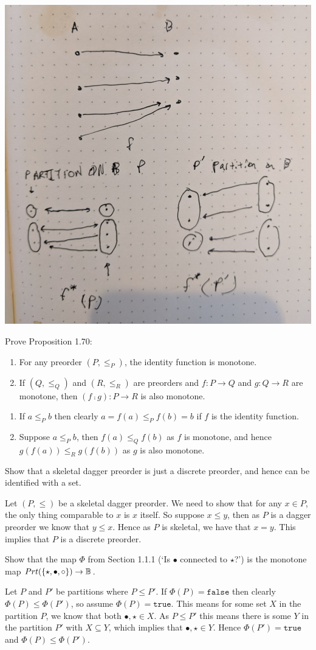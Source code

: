 \solution
\includegraphics[width=0.5\linewidth]{images/1-69.jpg}

Prove Proposition 1.70:
\begin{enumerate}
    \item For any preorder $(P, \leq_P)$, the identity function is monotone.
    \item If $(Q, \leq_Q)$ and $(R, \leq_R)$ are preorders and $f:P\to Q$ and $g:Q\to R$ are monotone, then $(f\fcmp g):P\to R$ is also monotone.
\end{enumerate}

\solution
\begin{enumerate}
	\item If $a \leq_P b$ then clearly $a = f(a)\leq_P f(b) = b$ if $f$ is the identity function.
	\item Suppose $a\leq_P b$, then $f(a) \leq_Q f(b)$ as $f$ is monotone, and hence $g(f(a)) \leq_R g(f(b))$ as $g$ is also monotone.
\end{enumerate}

Show that a skeletal dagger preorder is just a discrete preorder, and hence can be identified with a set.

\solution
Let $(P, \leq)$ be a skeletal dagger preorder.  We need to show that for any $x\in P$, the only thing comparable to $x$ is $x$ itself.  So suppose $x\leq y$, then as $P$ is a dagger preorder we know that $y\leq x$.  Hence as $P$ is skeletal, we have that $x=y$.  This implies that $P$ is a discrete preorder.

Show that the map $\Phi$ from Section 1.1.1 (`Is $\bullet$ connected to $\star$?') is the monotone map $Prt(\{\star, \bullet, \circ\})\to\mathbb{B}$.

\solution
Let $P$ and $P'$ be partitions where $P\leq P'$.  If $\Phi(P)=\texttt{false}$ then clearly $\Phi(P)\leq\Phi(P')$, so assume $\Phi(P) = \texttt{true}$.  This means for some set $X$ in the partition $P$, we know that both $\bullet, \star\in X$.  As $P\leq P'$ this means there is some $Y$ in the partition $P'$  with $X\subseteq Y$, which implies that $\bullet,\star\in Y$.  Hence $\Phi(P')=\texttt{true}$ and $\Phi(P)\leq\Phi(P')$.

